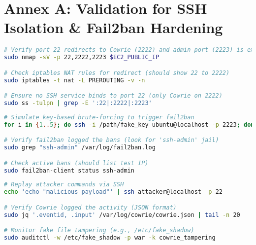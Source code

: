 \newpage

\section*{Annex A: Validation for SSH Isolation \& Fail2ban Hardening}  
\label{annexa}  

\begin{lstlisting}[language=bash, label={annexa:network}, caption={Network Isolation Verification}]  
# Verify port 22 redirects to Cowrie (2222) and admin port (2223) is exclusive  
sudo nmap -sV -p 22,2222,2223 $EC2_PUBLIC_IP  

# Check iptables NAT rules for redirect (should show 22 to 2222)  
sudo iptables -t nat -L PREROUTING -v -n  

# Ensure no SSH service binds to port 22 (only Cowrie on 2222)  
sudo ss -tulpn | grep -E ':22|:2222|:2223'  
\end{lstlisting}  

\begin{lstlisting}[language=bash, label={annexa:fail2ban}, caption={Fail2ban Efficacy Testing}]  
# Simulate key-based brute-forcing to trigger fail2ban  
for i in {1..5}; do ssh -i /path/fake_key ubuntu@localhost -p 2223; done  

# Verify fail2ban logged the bans (look for 'ssh-admin' jail)  
sudo grep "ssh-admin" /var/log/fail2ban.log  

# Check active bans (should list test IP)  
sudo fail2ban-client status ssh-admin  
\end{lstlisting}  

\begin{lstlisting}[language=bash, label={annexa:cowrie}, caption={Cowrie Logging Validation}]  
# Replay attacker commands via SSH  
echo 'echo "malicious payload"' | ssh attacker@localhost -p 22  

# Verify Cowrie logged the activity (JSON format)  
sudo jq '.eventid, .input' /var/log/cowrie/cowrie.json | tail -n 20  

# Monitor fake file tampering (e.g., /etc/fake_shadow)  
sudo auditctl -w /etc/fake_shadow -p war -k cowrie_tampering  
\end{lstlisting}  



\newpage

